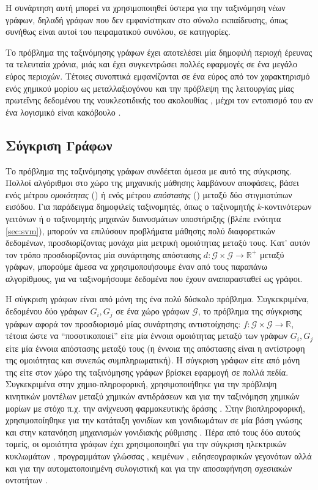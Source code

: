 Η συνάρτηση αυτή μπορεί να χρησιμοποιηθεί ύστερα για την ταξινόμηση νέων γράφων, δηλαδή γράφων που δεν εμφανίστηκαν στο σύνολο εκπαίδευσης, όπως συνήθως είναι αυτοί του πειραματικού συνόλου, σε κατηγορίες.\par
Το πρόβλημα της ταξινόμησης γράφων έχει αποτελέσει μία δημοφιλή περιοχή έρευνας τα τελευταία χρόνια, μιάς και έχει συγκεντρώσει πολλές εφαρμογές σε ένα μεγάλο εύρος περιοχών.
Τέτοιες συνοπτικά εμφανίζονται σε ένα εύρος από τον χαρακτηρισμό ενός χημικού μορίου ως μεταλλαξιογόνου \cite{Swamidass2005} και την πρόβλεψη της λειτουργίας μίας πρωτεΐνης δεδομένου της νουκλεοτιδικής του ακολουθίας \cite{Borgwardt2005}, μέχρι τον εντοπισμό του αν ένα λογισμικό είναι κακόβουλο \cite{Wagner2009}.
\subsection{Σύγκριση Γράφων}
Το πρόβλημα της ταξινόμησης γράφων συνδέεται άμεσα με αυτό της σύγκρισης.
Πολλοί αλγόριθμοι στο χώρο της μηχανικής μάθησης λαμβάνουν αποφάσεις, βάσει ενός μέτρου \textit{ομοιότητας} () ή ενός μέτρου \textit{απόστασης} () μεταξύ δύο στιγμιοτύπων εισόδου.
Για παράδειγμα δημοφιλείς ταξινομητές, όπως ο ταξινομητής $k$-κοντινότερων γειτόνων ή ο ταξινομητής μηχανών διανυσμάτων υποστήριξης (βλέπε ενότητα \ref{sec:svm}), μπορούν να επιλύσουν προβλήματα μάθησης πολύ διαφορετικών δεδομένων, προσδιορίζοντας μονάχα μία μετρική ομοιότητας μεταξύ τους.
Κατ' αυτόν τον τρόπο προσδιορίζοντας μία συνάρτησης απόστασης $d : \mathcal{G} \times \mathcal{G} \rightarrow \mathbb{R}^{+}$ μεταξύ γράφων, μπορούμε άμεσα να χρησιμοποιήσουμε έναν από τους παραπάνω αλγορίθμους, για να ταξινομήσουμε δεδομένα που έχουν αναπαρασταθεί ως γράφοι.\par
Η σύγκριση γράφων είναι από μόνη της ένα πολύ δύσκολο πρόβλημα.
Συγκεκριμένα, δεδομένου δύο γράφων $G_{i}, G_{j}$ σε ένα χώρο γράφων $\mathcal{G}$, το πρόβλημα της σύγκρισης γράφων αφορά τον προσδιορισμό μίας συνάρτησης αντιστοίχησης: $f: \mathcal{G} \times \mathcal{G} \rightarrow \mathbb{R}$, τέτοια ώστε να ``ποσοτικοποιεί'' είτε μία έννοια ομοιότητας μεταξύ των γράφων $G_{i}, G_{j}$ είτε μία έννοια απόστασης μεταξύ τους (η έννοια της απόστασης είναι η αντίστροφη της ομοιότητας και συνεπώς συμπληρωματική).
Η σύγκριση γράφων είτε από μόνη της είτε στον χώρο της ταξινόμησης γράφων βρίσκει εφαρμογή σε πολλά πεδία.
Συγκεκριμένα στην χημιο-πληροφορική, χρησιμοποιήθηκε για την πρόβλεψη κινητικών μοντέλων μεταξύ χημικών αντιδράσεων \cite{Genesys} και για την ταξινόμηση χημικών μορίων με στόχο π.χ. την ανίχνευση φαρμακευτικής δράσης \cite{Wale2008}.
Στην βιοπληροφορική, χρησιμοποίηθηκε για την κατάταξη γονιδίων και γονιδιωμάτων σε μία βάση γνώσης\cite{KEGG, Hattori2003} και στην κατανόηση μηχανισμών γονιδιακής ρύθμισης \cite{Davidson1669}.
Πέρα από τους δύο αυτούς τομείς, οι ομοιότητα γράφων έχει χρησιμοποιηθεί για την σύγκριση ηλεκτρικών κυκλωμάτων \cite{Takashima1988}, προγραμμάτων γλώσσας  \cite{Gitchell1999}, κειμένων \cite{Rousseau2015TextCA}, ειδησεογραφικών γεγονότων \cite{Glavas2013} αλλά και για την αυτοματοποιημένη συλογιστική \cite{Tsivtsivadze2011} και για την αποσαφήνηση σχεσιακών οντοτήτων \cite{Hermansson2013EntityDI}.
